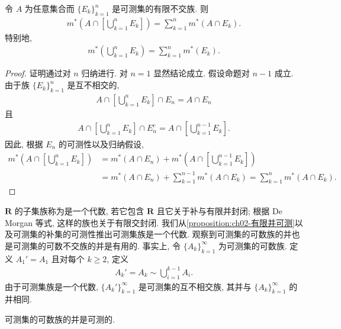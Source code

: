 \documentclass[../../main.tex]{subfiles}
\begin{document}
\begin{proposition}\label{proposition:ch02-有限不交可加}
令 $A$ 为任意集合而 $\{E_{k}\}_{k=1}^{n}$ 是可测集的有限不交族. 则
\begin{align*}
m^{*}\left(A\cap\left[\bigcup_{k=1}^{n}E_{k}\right]\right)=\sum_{k=1}^{n}m^{*}(A\cap E_{k}).
\end{align*}
特别地,
\begin{align*}
m^{*}\left(\bigcup_{k=1}^{n}E_{k}\right)=\sum_{k=1}^{n}m^{*}(E_{k}).
\end{align*}
\end{proposition}

\begin{proof}
证明通过对 $n$ 归纳进行. 对 $n=1$ 显然结论成立. 假设命题对 $n-1$ 成立. 由于族 $\{E_{k}\}_{k=1}^{n}$ 是互不相交的,
\begin{align*}
A\cap\left[\bigcup_{k=1}^{n}E_{k}\right]\cap E_{n}=A\cap E_{n}
\end{align*}
且
\begin{align*}
A\cap\left[\bigcup_{k=1}^{n}E_{k}\right]\cap E_{n}^{c}=A\cap\left[\bigcup_{k=1}^{n-1}E_{k}\right].
\end{align*}
因此, 根据 $E_{n}$ 的可测性以及归纳假设,
\begin{align*}
m^{*}\left(A\cap\left[\bigcup_{k=1}^{n}E_{k}\right]\right)&=m^{*}(A\cap E_{n})+m^{*}\left(A\cap\left[\bigcup_{k=1}^{n-1}E_{k}\right]\right)\\
&=m^{*}(A\cap E_{n})+\sum_{k=1}^{n-1}m^{*}(A\cap E_{k})=\sum_{k=1}^{n}m^{*}(A\cap E_{k}).
\end{align*}
\end{proof}

$\mathbf{R}$ 的子集族称为是一个代数, 若它包含 $\mathbf{R}$ 且它关于补与有限并封闭; 根据 De Morgan 等式, 这样的族也关于有限交封闭. 我们从\cref{proposition:ch02-有限并可测}以及可测集的补集的可测性推出可测集族是一个代数. 观察到可测集的可数族的并也是可测集的可数不交族的并是有用的. 事实上, 令 $\{A_{k}\}_{k=1}^{\infty}$ 为可测集的可数族. 定义 $A_{1}'=A_{1}$ 且对每个 $k\geqslant 2$, 定义
\begin{align*}
A_{k}'=A_{k}\sim\bigcup_{i=1}^{k-1}A_{i}.
\end{align*}
由于可测集族是一个代数, $\{A_{k}'\}_{k=1}^{\infty}$ 是可测集的互不相交族, 其并与 $\{A_{k}\}_{k=1}^{\infty}$ 的并相同.

\begin{proposition}\label{proposition:ch02-可数并可测}
可测集的可数族的并是可测的.
\end{proposition}
\end{document}
